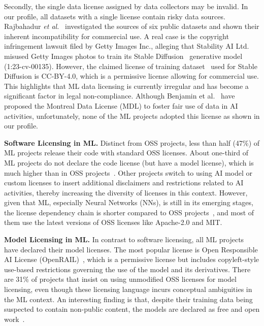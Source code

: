 Secondly, the single data license assigned by data collectors may be invalid.
In our profile, all datasets with a single license contain risky data sources.
Rajbahadur \textit{et al.}~\cite{rajbahadur2021can} investigated the sources of six public datasets and shown their inherent incompatibility for commercial use.
A real case is the copyright infringement lawsuit filed by Getty Images Inc., alleging that Stability AI Ltd. misused Getty Images photos to train its Stable Diffusion~\cite{rombach2022high} generative model (1:23-cv-00135).
However, the claimed license of training dataset~\cite{schuhmann2022laion} used for Stable Diffusion is CC-BY-4.0, which is a permissive license allowing for commercial use.
This highlights that ML data licensing is currently irregular and has become a significant factor in legal non-compliance.
Although Benjamin et al.~\cite{benjamin2019towards} have proposed the Montreal Data License (MDL) to foster fair use of data in AI activities, unfortunately, none of the ML projects adopted this license as shown in our profile.

\textbf{Software Licensing in ML.}
Distinct from OSS projects, less than half (47\%) of ML projects release their code with standard OSS licenses.
About one-third of ML projects do not declare the code license (but have a model license), which is much higher than in OSS projects~\cite{cui2023empirical}.
Other projects switch to using AI model or custom licenses to insert additional disclaimers and restrictions related to AI activities, thereby increasing the diversity of licenses in this context.
However, given that ML, especially Neural Networks (NNs), is still in its emerging stages, the license dependency chain is shorter compared to OSS projects~\cite{buchkova2022dasea}, and most of them use the latest versions of OSS licenses like Apache-2.0 and MIT.


\textbf{Model Licensing in ML.}
In contrast to software licensing, all ML projects have declared their model licenses.
The most popular license is Open Responsible AI License (OpenRAIL)~\cite{contractor2022behavioral}, which is a permissive license but includes copyleft-style use-based restrictions governing the use of the model and its derivatives.
There are 31\% of projects that insist on using unmodified OSS licenses for model licensing, even though these licensing language incurs conceptual ambiguities in the ML context.
An interesting finding is that, despite their training data being suspected to contain non-public content, the models are declared as free and open work~\cite{henderson2023foundation}.


